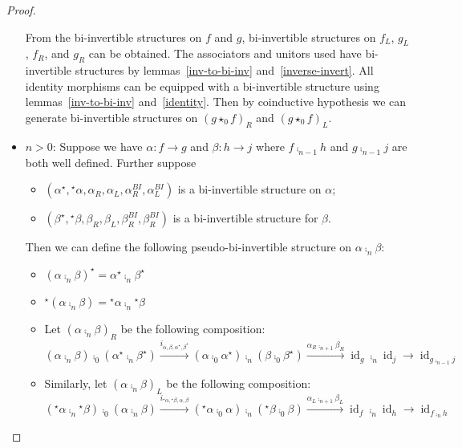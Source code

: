 \documentclass[draft]{article}
\DeclareMathOperator{\id}{id}
\newcommand{\linv}[1]{{}^\star\!#1} \newcommand{\rinv}[1]{#1^\star}
\begin{document}
\begin{proof}
\begin{itemize}
    From the bi-invertible structures on \(f\) and \(g\),
    bi-invertible structures on \(f_L\), \(g_L\), \(f_R\), and \(g_R\)
    can be obtained. The associators and unitors used have
    bi-invertible structures by lemmas~\ref{inv-to-bi-inv}
    and~\ref{inverse-invert}. All identity morphisms can be equipped
    with a bi-invertible structure using lemmas~\ref{inv-to-bi-inv}
    and~\ref{identity}. Then by coinductive hypothesis we can generate
    bi-invertible structures on \({(g \star_0 f)}_R\) and \({(g
      \star_0 f)}_L\).
  \item \(n > 0\): Suppose we have \(\alpha: f \to g\) and \(\beta: h
    \to j\) where \(f \comp_{n-1} h\) and \(g \comp_{n-1} j\) are both
    well defined. Further suppose
    \begin{itemize}
    \item \((\rinv \alpha, \linv \alpha, \alpha_R, \alpha_L,
      \alpha_R^{BI}, \alpha_L^{BI})\) is a bi-invertible structure on
      \(\alpha\);
    \item \((\rinv \beta, \linv \beta, \beta_R, \beta_L, \beta_R^{BI},
      \beta_R^{BI})\) is a bi-invertible structure for \(\beta\).
    \end{itemize}
    Then we can define the following pseudo-bi-invertible structure on
    \(\alpha \comp_n \beta\):
    \begin{itemize}
    \item \(\rinv {(\alpha \comp_n \beta)} = \rinv \alpha \comp_n
      \rinv \beta\)
    \item \(\linv {(\alpha \comp_n \beta)} = \linv \alpha \comp_n
      \linv \beta\)
    \item Let \({(\alpha \comp_n \beta)}_R\) be the following
      composition:
      \begin{equation*}
        (\alpha \comp_n \beta) \comp_0 (\rinv \alpha \comp_n \rinv \beta) \overset {i_{\alpha,\beta,\rinv \alpha, \rinv \beta}} \to (\alpha \comp_0 \rinv \alpha) \comp_n (\beta \comp_0 \rinv \beta) \overset {\alpha_R \comp_{n+1} \beta_R} \to \id_g \comp_n \id_j \to \id_{g \comp_{n-1} j}
      \end{equation*}
    \item Similarly, let \({(\alpha \comp_n \beta)}_L\) be the
      following composition:
      \begin{equation*}
        (\linv \alpha \comp_n \linv \beta) \comp_0 (\alpha \comp_n \beta) \overset {i_{\linv \alpha, \linv \beta, \alpha, \beta}} \to (\linv \alpha \comp_0 \alpha) \comp_n (\linv \beta \comp_0 \beta) \overset {\alpha _L \comp_{n+1} \beta _L} \to \id_f \comp_n \id_h \to \id_{f \comp_n h}

\end{equation*}
\end{itemize}
\end{itemize}
\end{proof}
\end{document}
